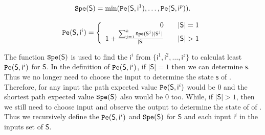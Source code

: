 \begin{definition} \label{lspe}
\begin{equation}
\begin{split}
{\tt Spe}(\mathsf{S})= \min({\tt Pe}(\mathsf{S}, \mathsf{ i}^{1}),\ldots,{\tt Pe}(\mathsf{S}, \mathsf{ i}^{p})).
\end{split}
\end{equation}
\end{definition}

\begin{definition} \label{spe}

\[\Pe(\mathsf{S}, \mathsf{ i}^{i})=\left\{
\begin{array}{rcl}
0      &      & {|\mathsf{S}|=1}\\
1 +\frac{\sum_{j=1}^k \Spe(\mathsf{S}^{j})|\mathsf{S}^{j}|}{ |\mathsf{S}|}       &      & {|\mathsf{S}|>1}
\end{array} \right. \]

\end{definition}

The function ${\tt Spe}(\mathsf{S})$ is used to find the $\mathsf{ i}^{i}$ from $\{\mathsf{ i}^{1},\mathsf{ i}^{2},\ldots, \mathsf{ i}^{z}\}$ to calculat least ${\tt Pe}(\mathsf{S}, \mathsf{ i}^{i})$ for $\mathsf{S}$. In the definition of ${\tt Pe}(\mathsf{S}, \mathsf{ i}^{i})$, if $|\mathsf{S}|=1$ then we can determine $\mathsf{s}$. Thus we no longer need to choose the input to determine the state $\mathsf{s}$ of \BCNs. Therefore, for any input the path expected value ${\tt Pe}(\mathsf{S}, \mathsf{ i}^{i})$ would be $0$ and the shortest path expected value ${\tt Spe}(\mathsf{S})$ also would be $0$ too. While, if $|\mathsf{S}|>1$, then we still need to choose input and observe the output to determine the state of of \BCNs. Thus we recursively define the ${\tt Pe}(\mathsf{S}, \mathsf{ i}^{i})$ and ${\tt Spe}(\mathsf{S})$ for $\mathsf{S}$ and each input $\mathsf{ i}^{i}$ in the inputs set of $\mathsf{S}$. 


